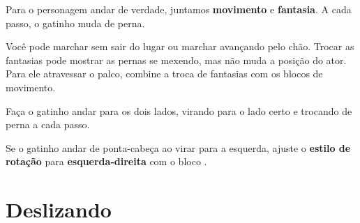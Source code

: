 Para o personagem andar de verdade, juntamos \textbf{movimento} e \textbf{fantasia}. A cada passo, o gatinho muda de perna.

\begin{pensaassim}
Você pode marchar sem sair do lugar ou marchar avançando pelo chão. Trocar as fantasias pode mostrar as pernas se mexendo, mas não muda a posição do ator. Para ele atravessar o palco, combine a troca de fantasias com os blocos de movimento.
\end{pensaassim}

\begin{codigo}
\begin{pilha}
\end{pilha}
\end{codigo}

\begin{missao}
Faça o gatinho andar para os dois lados, virando para o lado certo e trocando de perna a cada passo.
\end{missao}

\begin{codigo}
\begin{pilha}
\end{pilha}
\begin{pilha}
\end{pilha}
\end{codigo}

\begin{cuidado}
Se o gatinho andar de ponta-cabeça ao virar para a esquerda, ajuste o \textbf{estilo de rotação} para \textbf{esquerda-direita} com o bloco .
\end{cuidado}

\section{Deslizando}

